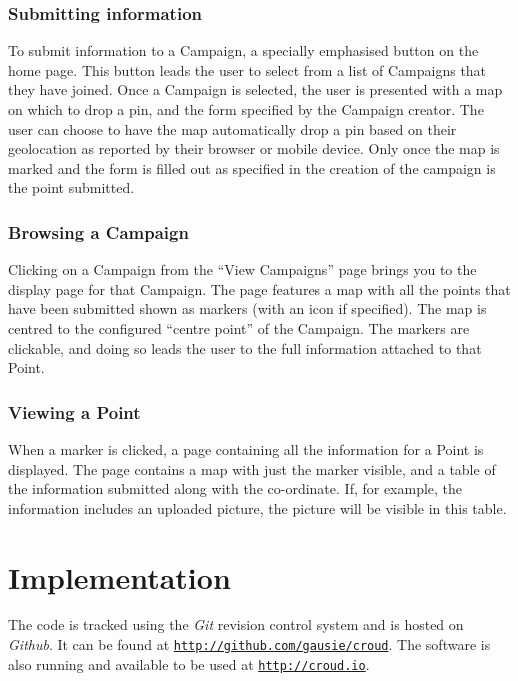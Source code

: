 \documentclass{article}
\let\oldsection\section
\renewcommand\section{\clearpage\oldsection}
\begin{document}
		\subsubsection{Submitting information}
		To submit information to a Campaign, a specially emphasised button on the home page. This button leads the user to select from a list of Campaigns that they have joined. Once a Campaign is selected, the user is presented with a map on which to drop a pin, and the form specified by the Campaign creator. The user can choose to have the map automatically drop a pin based on their geolocation as reported by their browser or mobile device. Only once the map is marked and the form is filled out as specified in the creation of the campaign is the point submitted.

		\subsubsection{Browsing a Campaign}
		Clicking on a Campaign from the ``View Campaigns'' page brings you to the display page for that Campaign. The page features a map with all the points that have been submitted shown as markers (with an icon if specified). The map is centred to the configured ``centre point'' of the Campaign. The markers are clickable, and doing so leads the user to the full information attached to that Point.

		\subsubsection{Viewing a Point}
		When a marker is clicked, a page containing all the information for a Point is displayed. The page contains a map with just the marker visible, and a table of the information submitted along with the co-ordinate. If, for example, the information includes an uploaded picture, the picture will be visible in this table.

	\section{Implementation}
	\label{sec:implementation}

		The code is tracked using the \emph{Git} revision control system and is hosted on \emph{Github}. It can be found at \href{http://github.com/gausie/croud}{\nolinkurl{http://github.com/gausie/croud}}. The software is also running and available to be used at \href{http://croud.io}{\nolinkurl{http://croud.io}}.
\end{document}
